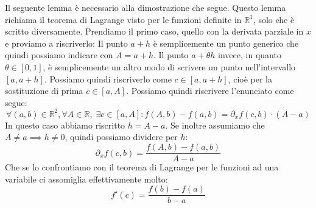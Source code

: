 Il seguente lemma è necessario alla dimostrazione che segue.
Questo lemma richiama il teorema di Lagrange visto per le funzioni definite in $\mathbb{R}^1$, solo che è scritto diversamente. Prendiamo il primo caso, quello con la derivata parziale in $x$ e proviamo a riscriverlo: Il punto $a + h$ è semplicemente un punto generico che quindi possiamo indicare con $A = a + h$. Il punto $a + \theta h$ invece, in quanto $\theta \in [0, 1]$, è semplicemente un altro modo di scrivere un punto nell'intervallo $[a, a + h]$. Possiamo quindi riscriverlo come $c \in [a, a+h]$, cioè per la sostituzione di prima $c \in [a, A]$. Possiamo quindi riscrivere l'enunciato come segue:
\begin{equation*}
	\forall (a, b) \in \mathbb{R}^2, \forall A \in \mathbb{R}, \; \exists c \in [a, A] : f(A, b) - f(a, b) = \partial_x f(c, b) \cdot (A - a)
\end{equation*}
In questo caso abbiamo riscritto $h = A - a$. Se inoltre assumiamo che $A \neq a \implies h \neq 0 $, quindi possiamo dividere per $h$:
\begin{equation*}
	\partial_x f(c, b) = \dfrac{f(A, b) - f(a, b)}{A - a}
\end{equation*}
Che se lo confrontiamo con il teorema di Lagrange per le funzioni ad una variabile ci assomiglia effettivamente molto:
\begin{equation*}
	f'(c) = \dfrac{f(b) - f(a)}{b - a}
\end{equation*}


